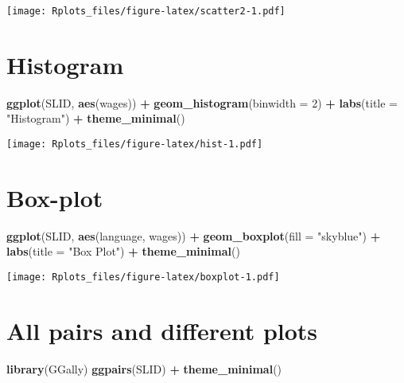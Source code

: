 \documentclass[]{article}
\newenvironment{Shaded}{\begin{snugshade}}{\end{snugshade}}
\newcommand{\KeywordTok}[1]{\textcolor[rgb]{0.13,0.29,0.53}{\textbf{#1}}}
\newcommand{\DataTypeTok}[1]{\textcolor[rgb]{0.13,0.29,0.53}{#1}}
\newcommand{\DecValTok}[1]{\textcolor[rgb]{0.00,0.00,0.81}{#1}}
\newcommand{\StringTok}[1]{\textcolor[rgb]{0.31,0.60,0.02}{#1}}
\newcommand{\OperatorTok}[1]{\textcolor[rgb]{0.81,0.36,0.00}{\textbf{#1}}}
\newcommand{\NormalTok}[1]{#1}
\begin{document}
\texttt{[image: Rplots\_files/figure-latex/scatter2-1.pdf]}

\section{Histogram}\label{histogram}

\begin{Shaded}
\begin{Highlighting}[]
\KeywordTok{ggplot}\NormalTok{(SLID, }\KeywordTok{aes}\NormalTok{(wages)) }\OperatorTok{+}\StringTok{ }\KeywordTok{geom_histogram}\NormalTok{(}\DataTypeTok{binwidth =} \DecValTok{2}\NormalTok{) }\OperatorTok{+}\StringTok{ }\KeywordTok{labs}\NormalTok{(}\DataTypeTok{title =} \StringTok{"Histogram"}\NormalTok{) }\OperatorTok{+}\StringTok{ }
\StringTok{    }\KeywordTok{theme_minimal}\NormalTok{()}
\end{Highlighting}
\end{Shaded}

\texttt{[image: Rplots\_files/figure-latex/hist-1.pdf]}

\section{Box-plot}\label{box-plot}

\begin{Shaded}
\begin{Highlighting}[]
\KeywordTok{ggplot}\NormalTok{(SLID, }\KeywordTok{aes}\NormalTok{(language, wages)) }\OperatorTok{+}\StringTok{ }\KeywordTok{geom_boxplot}\NormalTok{(}\DataTypeTok{fill =} \StringTok{"skyblue"}\NormalTok{) }\OperatorTok{+}\StringTok{ }\KeywordTok{labs}\NormalTok{(}\DataTypeTok{title =} \StringTok{"Box Plot"}\NormalTok{) }\OperatorTok{+}\StringTok{ }
\StringTok{    }\KeywordTok{theme_minimal}\NormalTok{()}
\end{Highlighting}
\end{Shaded}

\texttt{[image: Rplots\_files/figure-latex/boxplot-1.pdf]}

\section{All pairs and different
plots}\label{all-pairs-and-different-plots}

\begin{Shaded}
\begin{Highlighting}[]
\KeywordTok{library}\NormalTok{(GGally)}
\KeywordTok{ggpairs}\NormalTok{(SLID) }\OperatorTok{+}\StringTok{ }\KeywordTok{theme_minimal}\NormalTok{()}
\end{Highlighting}
\end{Shaded}
\end{document}
